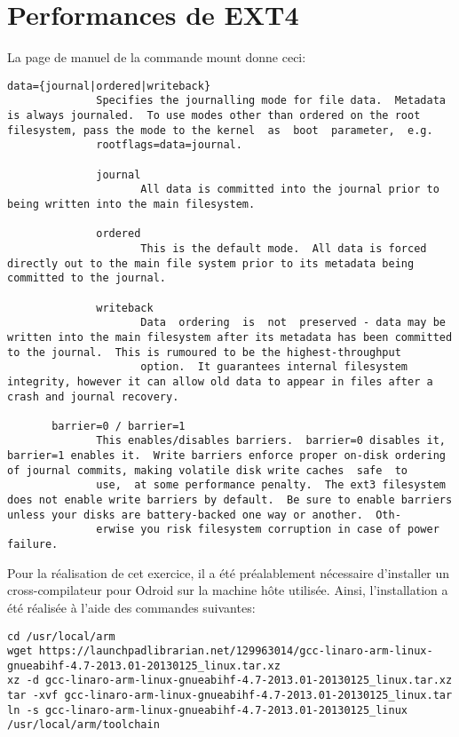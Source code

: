 \section{Performances de EXT4}

La page de manuel de la commande mount donne ceci:
\begin{lstlisting}[style=Bash]
data={journal|ordered|writeback}
              Specifies the journalling mode for file data.  Metadata is always journaled.  To use modes other than ordered on the root filesystem, pass the mode to the kernel  as  boot  parameter,  e.g.
              rootflags=data=journal.

              journal
                     All data is committed into the journal prior to being written into the main filesystem.

              ordered
                     This is the default mode.  All data is forced directly out to the main file system prior to its metadata being committed to the journal.

              writeback
                     Data  ordering  is  not  preserved - data may be written into the main filesystem after its metadata has been committed to the journal.  This is rumoured to be the highest-throughput
                     option.  It guarantees internal filesystem integrity, however it can allow old data to appear in files after a crash and journal recovery.

       barrier=0 / barrier=1
              This enables/disables barriers.  barrier=0 disables it, barrier=1 enables it.  Write barriers enforce proper on-disk ordering of journal commits, making volatile disk write caches  safe  to
              use,  at some performance penalty.  The ext3 filesystem does not enable write barriers by default.  Be sure to enable barriers unless your disks are battery-backed one way or another.  Oth‐
              erwise you risk filesystem corruption in case of power failure.
\end{lstlisting}

Pour la réalisation de cet exercice, il a été préalablement nécessaire d'installer un cross-compilateur pour Odroid sur la machine hôte utilisée. Ainsi, l'installation a été réalisée à l'aide des commandes suivantes:
\begin{lstlisting}[style=Bash]
cd /usr/local/arm
wget https://launchpadlibrarian.net/129963014/gcc-linaro-arm-linux-gnueabihf-4.7-2013.01-20130125_linux.tar.xz
xz -d gcc-linaro-arm-linux-gnueabihf-4.7-2013.01-20130125_linux.tar.xz 
tar -xvf gcc-linaro-arm-linux-gnueabihf-4.7-2013.01-20130125_linux.tar
ln -s gcc-linaro-arm-linux-gnueabihf-4.7-2013.01-20130125_linux /usr/local/arm/toolchain
\end{lstlisting}

